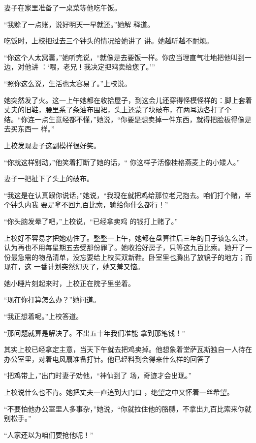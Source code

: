 \documentclass{article}
\begin{document}
妻子在家里准备了一桌菜等他吃午饭。 

“我赊了一点账，说好明天一早就还。”她解
释道。 

\newpage

吃饭时，上校把过去三个钟头的情况给她讲了
讲。她越听越不耐烦。 

“你这个人太窝囊，”她听完说，“就像是去要饭一样。你应当理直气壮地把他叫到一边，对他讲
：‘喂，老兄！我决定把鸡卖给您了。’” 

“照你这么说，生活也太容易了。”上校说。

她突然发了火。这一上午她都在收拾屋子，到这会儿还穿得怪模怪样的：脚上套着丈夫的旧鞋，腰里系了条油布围裙，头上还蒙了块破布，在两耳边各打了个结。“你连一点生意经都不懂，”她说，“你要是想卖掉一件东西，就得把脸板得像是去买东西一
样。” 


上校发现妻子这副模样很好笑。 

“你就这样别动，”他笑着打断了她的话，“
你这样子活像桂格燕麦上的小矮人。” 

\newpage


妻子一把扯下了头上的破布。 

“我这是在认真跟你说话，”她说，“我现在就把鸡给那位老兄抱去。咱们打个赌，半个钟头内我
要是拿不回九百比索，输给你什么都行！” 

“你头脑发晕了吧，”上校说，“已经拿卖鸡
的钱打上赌了。” 

上校好不容易才把她劝住了。整整一上午，她都在盘算往后三年的日子该怎么过，认为再也不用每星期五去受那份罪了。她收拾好房子，只等这九百比索。她开了一份最急需的物品清单，没忘要给上校买双新鞋。卧室里也腾出了放镜子的地方；而现在，这
一番计划突然幻灭了，她又羞又恼。 


她小睡片刻起来时，上校正在院子里坐着。 


“现在你打算怎么办？”她问道。 


\newpage

“我正想着呢。”上校答道。 

“那问题就算是解决了。不出五十年我们准能
拿到那笔钱！” 

其实上校已经拿定主意，当天下午就去把鸡卖掉。他想象着堂萨瓦斯独自一人待在办公室里，对着电风扇准备打针。他已经料到会得来什么样的回答了

“把鸡带上，”出门时妻子劝他，“神仙到了
场，奇迹才会出现。” 

上校说什么也不肯。她把丈夫一直追到大门口
，绝望之中又怀着一丝希望。 

“不要怕他办公室里人多事杂，”她说，“你就拉住他的胳膊，不拿出九百比索来你就别松手。”


“人家还以为咱们要抢他呢！” 
\end{document}
